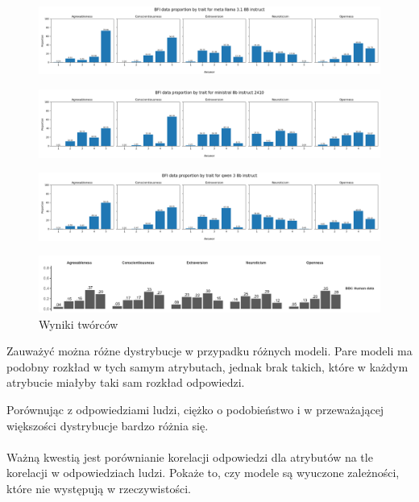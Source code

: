 \documentclass{article}
\begin{document}
\begin{figure}[H]
    \centering
    \includegraphics[width=0.7 \linewidth]{../Prompt_code/plots/meta-llama-3.1-8B-instruct/bfi_distribution.png}
\end{figure}

\begin{figure}[H]
    \centering
    \includegraphics[width=0.7 \linewidth]{../Prompt_code/plots/ministral-8b-instruct-2410/bfi_distribution.png}
\end{figure}

\begin{figure}[H]
    \centering
    \includegraphics[width=0.7 \linewidth]{../Prompt_code/plots/qwen-3-8b-instruct/bfi_distribution.png}
\end{figure}

\begin{figure}[H]
    \centering
    \includegraphics[width=0.7 \linewidth]{./article_data/human_distr.png}
    \caption{Wyniki twórców}
\end{figure}

Zauważyć można różne dystrybucje w przypadku różnych modeli. Pare modeli ma podobny rozkład w tych samym atrybutach, jednak brak takich, które w każdym atrybucie miałyby taki sam rozkład odpowiedzi. 

Porównując z odpowiedziami ludzi, ciężko o podobieństwo i w przeważającej większości dystrybucje bardzo różnia się. \\ \\ 

Ważną kwestią jest porównianie korelacji odpowiedzi dla atrybutów na tle korelacji w odpowiedziach ludzi. Pokaże to, czy modele są wyuczone zależności, które nie występują w rzeczywistości.
\end{document}

